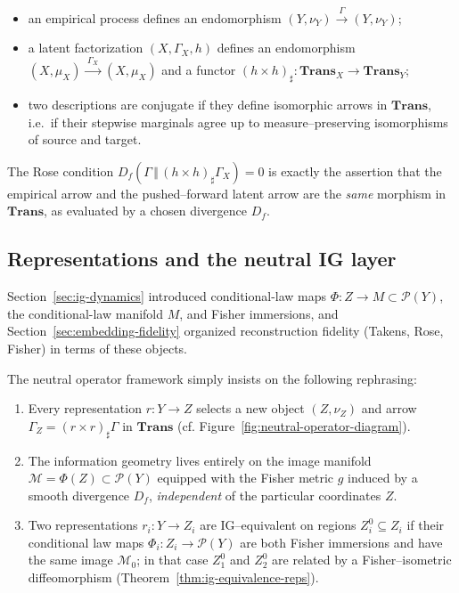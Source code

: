 \documentclass[11pt]{article}
\newcommand{\1}{\mathbf{1}}
\begin{document}
\begin{itemize}
  \item an empirical process defines an endomorphism
        \((Y,\nu_Y) \xrightarrow{\;\Gamma\;} (Y,\nu_Y)\);
  \item a latent factorization \((X,\Gamma_X,h)\) defines an endomorphism
        \((X,\mu_X) \xrightarrow{\;\Gamma_X\;} (X,\mu_X)\) and a functor
        \((h \times h)_\sharp : \mathbf{Trans}_X \to \mathbf{Trans}_Y\);
  \item two descriptions are conjugate if they define isomorphic arrows in \(\mathbf{Trans}\), i.e.\ if
        their stepwise marginals agree up to measure–preserving isomorphisms of source and target.
\end{itemize}

The Rose condition \(D_f(\Gamma \,\Vert\, (h \times h)_\sharp \Gamma_X) = 0\) is exactly the assertion that the empirical arrow and the pushed–forward latent arrow are the \emph{same} morphism in \(\mathbf{Trans}\), as evaluated by a chosen divergence \(D_f\).

\subsection{Representations and the neutral IG layer}

Section~\ref{sec:ig-dynamics} introduced conditional-law maps $\Phi : Z \to M \subset \mathcal P(Y)$, the conditional-law manifold $M$, and Fisher immersions, and Section~\ref{sec:embedding-fidelity} organized reconstruction fidelity (Takens, Rose, Fisher) in terms of these objects.

The neutral operator framework simply insists on the following rephrasing:

\begin{enumerate}
  \item Every representation \(r : Y \to Z\) selects a new object \((Z,\nu_Z)\) and arrow
        \(\Gamma_Z = (r \times r)_\sharp \Gamma\) in \(\mathbf{Trans}\) (cf. Figure~\ref{fig:neutral-operator-diagram}).
  \item The information geometry lives entirely on the image manifold
        \(\mathcal{M} = \Phi(Z) \subset \mathcal{P}(Y)\) equipped with the Fisher metric \(g\) induced by
        a smooth divergence \(D_f\), \emph{independent} of the particular coordinates \(Z\).
  \item Two representations \(r_i : Y \to Z_i\) are IG–equivalent on regions
        \(Z_i^0 \subseteq Z_i\) if their conditional law maps
        \(\Phi_i : Z_i \to \mathcal{P}(Y)\) are both Fisher immersions and have the same image
        \(\mathcal{M}_0\); in that case \(Z_1^0\) and \(Z_2^0\) are related by a Fisher–isometric
        diffeomorphism (Theorem~\ref{thm:ig-equivalence-reps}).
\end{enumerate}
\end{document}
